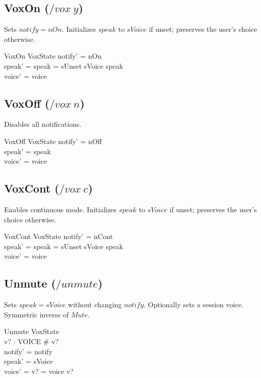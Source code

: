 \documentclass[a4paper,10pt,fleqn]{article}
\begin{document}
\subsection{VoxOn ($\mathord{/vox~y}$)}

Sets $notify = nOn$. Initializes $speak$ to $sVoice$ if
unset; preserves the user's choice otherwise.

\begin{schema}{VoxOn}
  \Delta VoxState
  \where
  notify' = nOn \\
  speak' = \IF speak = sUnset \THEN sVoice \ELSE speak \\
  voice' = voice
\end{schema}

\subsection{VoxOff ($\mathord{/vox~n}$)}

Disables all notifications.

\begin{schema}{VoxOff}
  \Delta VoxState
  \where
  notify' = nOff \\
  speak' = speak \\
  voice' = voice
\end{schema}

\subsection{VoxCont ($\mathord{/vox~c}$)}

Enables continuous mode. Initializes $speak$ to $sVoice$
if unset; preserves the user's choice otherwise.

\begin{schema}{VoxCont}
  \Delta VoxState
  \where
  notify' = nCont \\
  speak' = \IF speak = sUnset \THEN sVoice \ELSE speak \\
  voice' = voice
\end{schema}

\subsection{Unmute ($\mathord{/unmute}$)}

Sets $speak = sVoice$ without changing $notify$.
Optionally sets a session voice. Symmetric inverse
of $Mute$.

\begin{schema}{Unmute}
  \Delta VoxState \\
  v? : \power VOICE
  \where
  \# v?  \\
  notify' = notify \\
  speak' = sVoice \\
  voice' = \IF v? = \emptyset \THEN voice \ELSE v?
\end{schema}
\end{document}
